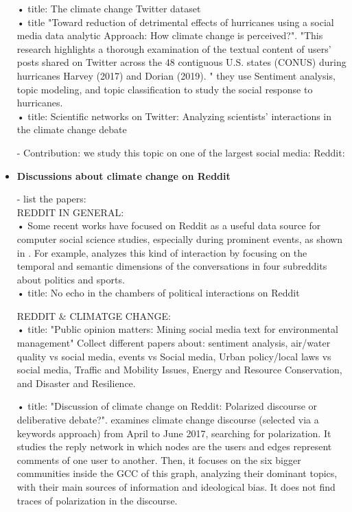 \begin{itemize}
• \cite{effrosynidis2022climate} title: The climate change Twitter dataset\\

• \cite{karimiziarani2023toward} title "Toward reduction of detrimental effects of hurricanes using a social media data analytic Approach: How climate change is perceived?". "This research highlights a thorough examination of the textual content of users’ posts shared on Twitter across the 48 contiguous U.S. states (CONUS) during hurricanes Harvey (2017) and Dorian (2019). " they use Sentiment analysis, topic modeling, and topic classification to study the social response to hurricanes. \\

• \cite{walter2019scientific} title: Scientific networks on Twitter: Analyzing scientists’ interactions in the climate change debate


- Contribution: we study this topic on one of the largest social media: Reddit:

\item \textbf{Discussions about climate change on Reddit}

- list the papers:\\
REDDIT IN GENERAL:\\
• Some recent works have focused on Reddit as a useful data source for computer social science studies, especially during prominent events, as shown in \cite{proferes2021studying}. For example, \cite{desiderio2023recurring} analyzes this kind of interaction by focusing on the temporal and semantic dimensions of the conversations in four subreddits about politics and sports.\\ 


• \cite{de2021no} title: No echo in the chambers of political interactions on Reddit

REDDIT \& CLIMATGE CHANGE:\\
• \cite{du2020public} title: "Public opinion matters: Mining social media text for environmental management" Collect different papers about:
sentiment analysis, air/water quality vs social media, events vs Social media, Urban policy/local laws vs social media, Traffic and Mobility Issues, Energy and Resource Conservation, and Disaster and Resilience.  


• \cite{treen2022discussion} title: "Discussion of climate change on Reddit: Polarized discourse or deliberative debate?". examines climate change discourse (selected via a keywords approach) from April to June 2017, searching for polarization. It studies the reply network in which nodes are the users and edges represent comments of one user to another. Then, it focuses on the six bigger communities inside the GCC of this graph, analyzing their dominant topics, with their main sources of information and ideological bias. It does not find traces of polarization in the discourse. \\


\end{itemize}
